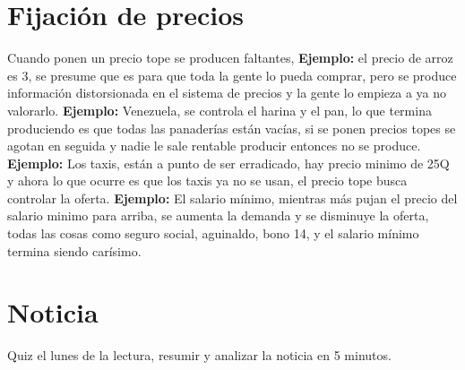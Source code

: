 \section{Fijación de precios}
Cuando ponen un precio tope se producen faltantes, \textbf{Ejemplo: } el precio de arroz es 3, se presume que es para que toda la gente lo pueda comprar, pero se produce información distorsionada en el sistema de precios y la gente lo empieza a ya no valorarlo. \textbf{Ejemplo: } Venezuela, se controla el harina y el pan, lo que termina produciendo es que todas las panaderías están vacías, si se ponen precios topes se agotan en seguida y nadie le sale rentable producir entonces no se produce. \textbf{Ejemplo: } Los taxis, están a punto de ser erradicado, hay precio minimo de 25Q y ahora lo que ocurre es que los taxis ya no se usan, el precio tope busca controlar la oferta. \textbf{Ejemplo: } El salario mínimo, mientras más pujan el precio del salario minimo para arriba, se aumenta la demanda y se disminuye la oferta, todas las cosas como seguro social, aguinaldo, bono 14, y el salario mínimo termina siendo carísimo. 

\section{Noticia}
Quiz el lunes de la lectura, resumir y analizar la noticia en 5 minutos. 

